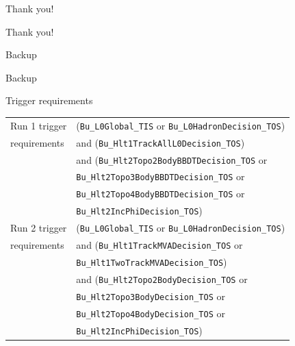 \documentclass{beamer}
\begin{document}
\begin{frame}{Thank you!}
  \begin{center}
    {\huge Thank you!}
  \end{center}
\end{frame}

\begin{frame}{Backup}
  \begin{center}
    {\huge Backup}
  \end{center}
\end{frame}

\begin{frame}{Trigger requirements}
  \centering
  \def\arraystretch{1.2}%
  \begin{tabular}{|l|l|}
    \hline
    Run 1 trigger        & (\texttt{Bu\_L0Global\_TIS} or \texttt{Bu\_L0HadronDecision\_TOS}) \\
    requirements         & and (\texttt{Bu\_Hlt1TrackAllL0Decision\_TOS}) \\
                         & and (\texttt{Bu\_Hlt2Topo2BodyBBDTDecision\_TOS} or \\
                         & \texttt{Bu\_Hlt2Topo3BodyBBDTDecision\_TOS} or \\
                         & \texttt{Bu\_Hlt2Topo4BodyBBDTDecision\_TOS} or \\
                         & \texttt{Bu\_Hlt2IncPhiDecision\_TOS}) \\
    \hline
    Run 2 trigger        & (\texttt{Bu\_L0Global\_TIS} or \texttt{Bu\_L0HadronDecision\_TOS}) \\
    requirements         & and (\texttt{Bu\_Hlt1TrackMVADecision\_TOS} or \\
                         & \texttt{Bu\_Hlt1TwoTrackMVADecision\_TOS}) \\
                         & and (\texttt{Bu\_Hlt2Topo2BodyDecision\_TOS} or \\
                         & \texttt{Bu\_Hlt2Topo3BodyDecision\_TOS} or \\
                         & \texttt{Bu\_Hlt2Topo4BodyDecision\_TOS} or \\
                         & \texttt{Bu\_Hlt2IncPhiDecision\_TOS}) \\
    \hline
  \end{tabular}
\end{frame}
\end{document}
